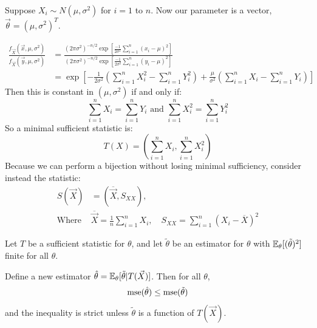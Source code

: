 \documentclass[../Main.tex]{subfiles}
\begin{document}
\begin{example}
    Suppose $X_i \sim N(\mu, \sigma^2)$ for $i = 1$ to $n$. Now our parameter is a vector, $\vec{\theta} = (\mu, \sigma^2)^T$.

    \begin{align*}
        \frac{f_{\vec{X}}(\vec{x}, \mu, \sigma^2)}{f_{\vec{X}}(\vec{y}, \mu, \sigma^2)}&= \frac{(2\pi\sigma^2)^{-n / 2} \exp\left[\frac{-1}{2\sigma^2} \sum_{i=1}^n (x_i - \mu)^2\right]}{(2\pi\sigma^2)^{-n / 2} \exp\left[\frac{-1}{2\sigma^2} \sum_{i=1}^n (y_i - \mu)^2\right]} \\
        &= \exp\left[-\frac{1}{2\sigma^2} \left(\sum_{i=1}^n X_i^2 - \sum_{i=1}^n Y_i^2\right) + \frac{\mu}{\sigma^2} \left(\sum_{i=1}^n X_i - \sum_{i=1}^{n} Y_i\right)\right]
    \end{align*}
    Then this is constant in $(\mu, \sigma^2)$ if and only if:
    \begin{equation*}
        \sum_{i=1}^n X_i = \sum_{i=1}^n Y_i \text{ and } \sum_{i=1}^n X_i^2 = \sum_{i=1}^n Y_i^2
    \end{equation*}
    So a minimal sufficient statistic is:
    \begin{equation*}
        T(X) = \left(\sum_{i=1}^n X_i, \sum_{i=1}^n X_i^2\right)
    \end{equation*}
    Because we can perform a bijection without losing minimal sufficiency, consider instead the statistic:
    \begin{align*}
        S(\vec{X}) &= (\overline{\vec{X}}, S_{XX}),\\
        \text{Where }&\overline{\vec{X}} = \frac1n \sum_{i=1}^{n} X_i,\quad S_{XX} = \sum_{i=1}^{n} (X_i - \overline{X})^2
    \end{align*}
\end{example}
\begin{theorem}
    Let $T$ be a sufficient statistic for $\theta$, and let $\tilde{\theta}$ be an estimator for $\theta$ with $\mathbb{E}_\theta[(\tilde{\theta})^2]$ finite for all $\theta$.

    Define a new estimator $\hat{\theta} = \mathbb{E}_\theta[\tilde{\theta} | T(\vec{X})]$. Then for all $\theta$,
    \begin{equation}
        \operatorname{mse}(\hat{\theta}) \leq \operatorname{mse}(\tilde{\theta})
        \label{eqnRaoBlackwellIneq}
    \end{equation}
    and the inequality is strict unless $\tilde{\theta}$ is a function of $T(\vec{X})$.
    \label{thmRaoBlackwell}
\end{theorem}
\end{document}
